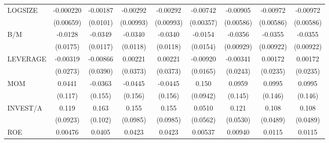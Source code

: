 \begin{table}[htbp]
\begin{tabular}{l*{8}{c}}
LOGSIZE             &   -0.000220         &    -0.00187         &    -0.00292         &    -0.00292         &    -0.00742\sym{**} &    -0.00905         &    -0.00972         &    -0.00972         \\
                    &   (0.00659)         &    (0.0101)         &   (0.00993)         &   (0.00993)         &   (0.00357)         &   (0.00586)         &   (0.00586)         &   (0.00586)         \\
B/M                 &     -0.0128         &     -0.0349\sym{***}&     -0.0340\sym{***}&     -0.0340\sym{***}&     -0.0154         &     -0.0356\sym{***}&     -0.0355\sym{***}&     -0.0355\sym{***}\\
                    &    (0.0175)         &    (0.0117)         &    (0.0118)         &    (0.0118)         &    (0.0154)         &   (0.00929)         &   (0.00922)         &   (0.00922)         \\
LEVERAGE            &    -0.00319         &    -0.00866         &     0.00221         &     0.00221         &    -0.00920         &    -0.00341         &     0.00172         &     0.00172         \\
                    &    (0.0273)         &    (0.0390)         &    (0.0373)         &    (0.0373)         &    (0.0165)         &    (0.0243)         &    (0.0235)         &    (0.0235)         \\
MOM                 &      0.0441         &     -0.0363         &     -0.0445         &     -0.0445         &       0.150         &      0.0959         &      0.0995         &      0.0995         \\
                    &     (0.117)         &     (0.155)         &     (0.156)         &     (0.156)         &    (0.0942)         &     (0.145)         &     (0.146)         &     (0.146)         \\
INVEST/A            &       0.119         &       0.163         &       0.155         &       0.155         &      0.0510         &       0.121\sym{**} &       0.108\sym{**} &       0.108\sym{**} \\
                    &    (0.0923)         &     (0.102)         &    (0.0985)         &    (0.0985)         &    (0.0562)         &    (0.0530)         &    (0.0489)         &    (0.0489)         \\
ROE                 &     0.00476         &      0.0405         &      0.0423         &      0.0423         &     0.00537         &     0.00940         &      0.0115         &      0.0115         \\

\end{tabular}
\end{table}
